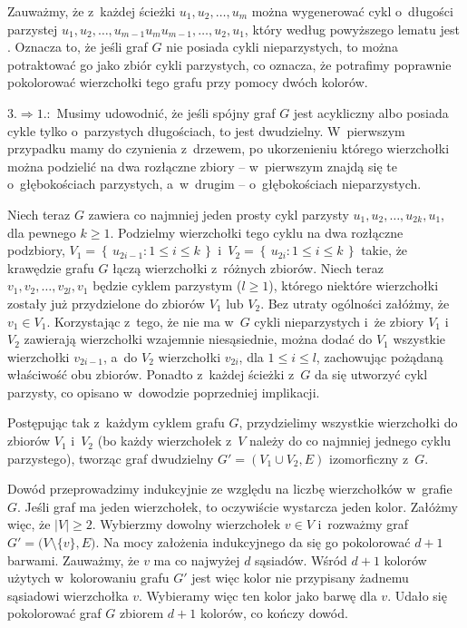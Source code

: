 Zauważmy, że z~każdej ścieżki $u_1,u_2,\dots,u_m$ można wygenerować cykl o~długości parzystej $u_1,u_2,\dots,u_{m-1}u_mu_{m-1},\dots,u_2,u_1$, który według powyższego lematu jest . Oznacza to, że jeśli graf $G$ nie posiada cykli nieparzystych, to można potraktować go jako zbiór cykli parzystych, co oznacza, że potrafimy poprawnie pokolorować wierzchołki tego grafu przy pomocy dwóch kolorów.
\bigskip

$3.\Rightarrow 1.\!\!:$ Musimy udowodnić, że jeśli spójny graf $G$ jest acykliczny albo posiada cykle tylko o~parzystych długościach, to jest dwudzielny. W~pierwszym przypadku mamy do czynienia z~drzewem, po ukorzenieniu którego wierzchołki można podzielić na dwa rozłączne zbiory -- w~pierwszym znajdą się te o~głębokościach parzystych, a~w~drugim -- o~głębokościach nieparzystych.

Niech teraz $G$ zawiera co najmniej jeden prosty cykl parzysty $u_1,u_2,\dots,u_{2k},u_1$, dla pewnego $k\ge1$. Podzielmy wierzchołki tego cyklu na dwa rozłączne podzbiory, $V_1=\left\{\,u_{2i-1}:1\le i\le k\,\right\}$ i~$V_2=\left\{\,u_{2i}:1\le i\le k\,\right\}$ takie, że krawędzie grafu $G$ łączą wierzchołki z~różnych zbiorów. Niech teraz $v_1,v_2,\dots,v_{2l},v_1$ będzie cyklem parzystym ($l\ge1$), którego niektóre wierzchołki zostały już przydzielone do zbiorów $V_1$ lub $V_2$. Bez utraty ogólności załóżmy, że $v_1\in V_1$. Korzystając z~tego, że nie ma w~$G$ cykli nieparzystych i~że zbiory $V_1$ i~$V_2$ zawierają wierzchołki wzajemnie niesąsiednie, można dodać do $V_1$ wszystkie wierzchołki $v_{2i-1}$, a~do $V_2$ wierzchołki $v_{2i}$, dla $1\le i\le l$, zachowując pożądaną właściwość obu zbiorów. Ponadto z~każdej ścieżki z~$G$ da się utworzyć cykl parzysty, co opisano w~dowodzie poprzedniej implikacji.

Postępując tak z~każdym cyklem grafu $G$, przydzielimy wszystkie wierzchołki do zbiorów $V_1$ i~$V_2$ (bo każdy wierzchołek z~$V$ należy do co najmniej jednego cyklu parzystego), tworząc graf dwudzielny $G'=(V_1\cup V_2,E)$ izomorficzny z~$G$.

\subproblem %
Dowód przeprowadzimy indukcyjnie ze względu na liczbę wierzchołków w~grafie $G$. Jeśli graf ma jeden wierzchołek, to oczywiście wystarcza jeden kolor. Załóżmy więc, że $|V|\ge2$. Wybierzmy dowolny wierzchołek $v\in V$ i~rozważmy graf $G'=\bigl(V\setminus\{v\},E\bigr)$. Na mocy założenia indukcyjnego da się go pokolorować $d+1$ barwami. Zauważmy, że $v$ ma co najwyżej $d$ sąsiadów. Wśród $d+1$ kolorów użytych w~kolorowaniu grafu $G'$ jest więc kolor nie przypisany żadnemu sąsiadowi wierzchołka $v$. Wybieramy więc ten kolor jako barwę dla $v$. Udało się pokolorować graf $G$ zbiorem $d+1$ kolorów, co kończy dowód.

